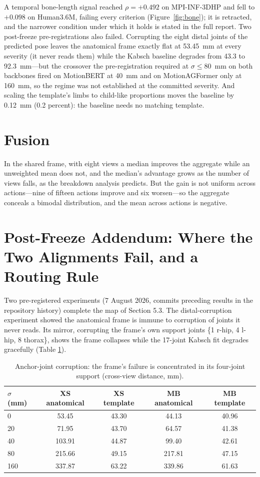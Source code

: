 \documentclass[12pt,a4paper]{report}
\begin{document}
A temporal bone-length signal reached $\rho = +0.492$ on MPI-INF-3DHP and fell to $+0.098$ on Human3.6M, failing every criterion (Figure~\ref{fig:bone}); it is retracted, and the narrower condition under which it holds is stated in the full report. Two post-freeze pre-registrations also failed. Corrupting the eight distal joints of the predicted pose leaves the anatomical frame exactly flat at 53.45~mm at every severity (it never reads them) while the Kabsch baseline degrades from 43.3 to 92.3~mm---but the crossover the pre-registration required at $\sigma \le 80$~mm on both backbones fired on MotionBERT at 40~mm and on MotionAGFormer only at 160~mm, so the regime was not established at the committed severity. And scaling the template's limbs to child-like proportions moves the baseline by 0.12~mm (0.2 percent): the baseline needs no matching template.

\section{Fusion}
\label{sec:fusion}

In the shared frame, with eight views a median improves the aggregate while an unweighted mean does not, and the median's advantage grows as the number of views falls, as the breakdown analysis predicts. But the gain is not uniform across actions---nine of fifteen actions improve and six worsen---so the aggregate conceals a bimodal distribution, and the mean across actions is negative.

\section{Post-Freeze Addendum: Where the Two Alignments Fail, and a Routing Rule}
\label{sec:addendum}

Two pre-registered experiments (7 August 2026, commits preceding results in the repository history) complete the map of Section 5.3. The distal-corruption experiment showed the anatomical frame is immune to corruption of joints it never reads. Its mirror, corrupting the frame's own support joints \{1 r-hip, 4 l-hip, 8 thorax\}, shows the frame collapses while the 17-joint Kabsch fit degrades gracefully (Table \ref{tab:anchor}).

\begin{table}[H]
\centering
\caption[Anchor-joint corruption]{Anchor-joint corruption: the frame's failure is concentrated in its four-joint support (cross-view distance, mm).}
\label{tab:anchor}
\begin{tabular}{lcccc}
\toprule
$\sigma$ (mm) & XS anatomical & XS template & MB anatomical & MB template \\
\midrule
0 & 53.45 & 43.30 & 44.13 & 40.96 \\
20 & 71.95 & 43.70 & 64.57 & 41.38 \\
40 & 103.91 & 44.87 & 99.40 & 42.61 \\
80 & 215.66 & 49.15 & 217.81 & 47.15 \\
160 & 337.87 & 63.22 & 339.86 & 61.63 \\
\bottomrule
\end{tabular}
\end{table}
\end{document}
